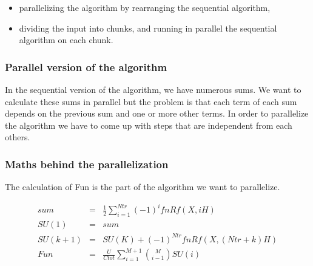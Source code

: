 \documentclass[11pt,a4paper]{article}
\begin{document}
\begin{itemize}

\item parallelizing the algorithm by rearranging the sequential algorithm,

\item dividing the input into chunks, and running in parallel the sequential algorithm on each chunk.

\end{itemize}

\subsubsection{Parallel version of the algorithm}

In the sequential version of the algorithm, we have numerous sums. We want to calculate these sums in parallel but the problem is that each term of each sum depends on the previous sum and one or more other terms. In order to parallelize the algorithm we have to come up with steps that are independent from each others.

\subsubsection*{Maths behind the parallelization}

The calculation of Fun is the part of the algorithm we want to parallelize.

\begin{eqnarray}
	sum &=& \frac{1}{2}   \sum_{i=1}^{Ntr} (-1)^{i}fnRf(X,iH)\\
	SU(1) &=& sum  \\
	SU(k + 1) &=& SU(K) + (-1)^{Ntr}fnRf(X,(Ntr + k)H) \label{SU(i)}\\
	Fun &=&\frac{U}{Ctot} \sum_{i=1}^{M+1} \binom{M}{i-1}SU(i) \label{Fun}
\end{eqnarray}
\end{document}
